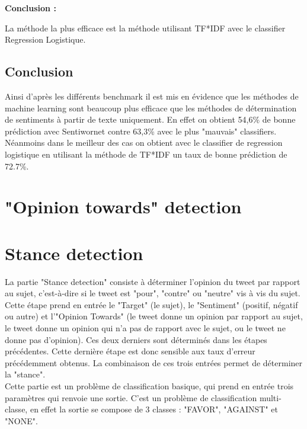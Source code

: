 \par \textbf{Conclusion :} \\
\par La méthode la plus efficace est la méthode utilisant TF*IDF avec le classifier Regression Logistique. \\


\subsection{Conclusion}

\par Ainsi d'après les différents benchmark il est mis en évidence que les méthodes de machine learning sont beaucoup plus efficace que les méthodes de détermination de sentiments à partir de texte uniquement. En effet on obtient 54,6\% de bonne prédiction avec Sentiwornet contre 63,3\% avec le plus "mauvais" classifiers. Néanmoins dans le meilleur des cas on obtient avec le classifier de regression logistique en utilisant la méthode de TF*IDF un taux de bonne prédiction de 72.7\%.

 
\section{"Opinion towards" detection}

\section{Stance detection}

La partie "Stance detection" consiste à déterminer l'opinion du tweet par rapport au sujet, c'est-à-dire si le tweet est "pour", "contre" ou "neutre" vis à vis du sujet. Cette étape prend en entrée le "Target" (le sujet), le "Sentiment" (positif, négatif ou autre) et l'"Opinion Towards" (le tweet donne un opinion par rapport au sujet, le tweet donne un opinion qui n'a pas de rapport avec le sujet, ou le tweet ne donne pas d'opinion). Ces deux derniers sont déterminés dans les étapes précédentes. Cette dernière étape est donc sensible aux taux d'erreur précédemment obtenus.
La combinaison de ces trois entrées permet de déterminer la "stance". \\

Cette partie est un problème de classification basique, qui prend en entrée trois paramètres qui renvoie une sortie. C'est un problème de classification multi-classe, en effet la sortie se compose de 3 classes : "FAVOR", "AGAINST" et "NONE". \\

